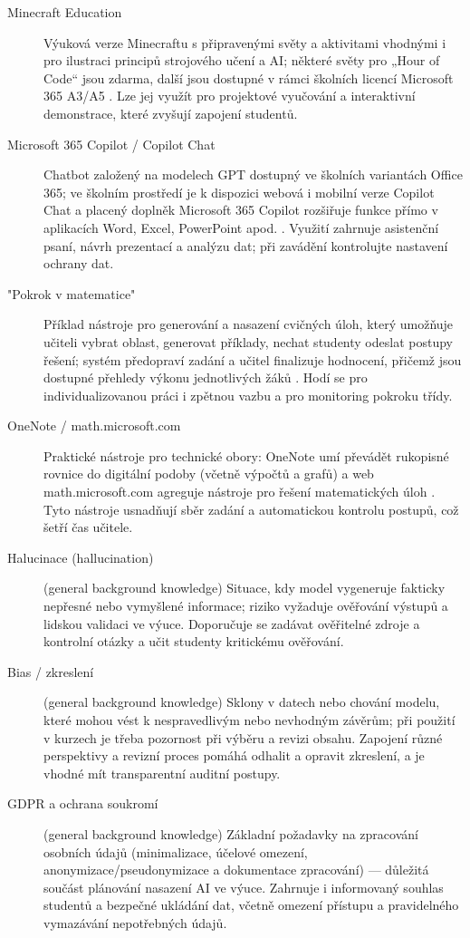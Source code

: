 \documentclass{report}%
\begin{document}
\begin{description}
  \item[Minecraft Education] Výuková verze Minecraftu s připravenými světy a aktivitami vhodnými i pro ilustraci principů strojového učení a AI; některé světy pro „Hour of Code“ jsou zdarma, další jsou dostupné v rámci školních licencí Microsoft 365 A3/A5 \cite{kb_ai_101_tipu_pdf_04e4a115_page_15_2}. Lze jej využít pro projektové vyučování a interaktivní demonstrace, které zvyšují zapojení studentů.
  \item[Microsoft 365 Copilot / Copilot Chat] Chatbot založený na modelech GPT dostupný ve školních variantách Office 365; ve školním prostředí je k dispozici webová i mobilní verze Copilot Chat a placený doplněk Microsoft 365 Copilot rozšiřuje funkce přímo v aplikacích Word, Excel, PowerPoint apod. \cite{kb_ai_101_tipu_pdf_04e4a115_page_3_1}. Využití zahrnuje asistenční psaní, návrh prezentací a analýzu dat; při zavádění kontrolujte nastavení ochrany dat.
  \item["Pokrok v matematice"] Příklad nástroje pro generování a nasazení cvičných úloh, který umožňuje učiteli vybrat oblast, generovat příklady, nechat studenty odeslat postupy řešení; systém předopraví zadání a učitel finalizuje hodnocení, přičemž jsou dostupné přehledy výkonu jednotlivých žáků \cite{kb_ai_101_tipu_pdf_04e4a115_page_8_1}. Hodí se pro individualizovanou práci i zpětnou vazbu a pro monitoring pokroku třídy.
  \item[OneNote / math.microsoft.com] Praktické nástroje pro technické obory: OneNote umí převádět rukopisné rovnice do digitální podoby (včetně výpočtů a grafů) a web math.microsoft.com agreguje nástroje pro řešení matematických úloh \cite{kb_ai_101_tipu_pdf_04e4a115_page_8_1}. Tyto nástroje usnadňují sběr zadání a automatickou kontrolu postupů, což šetří čas učitele.
  \item[Halucinace (hallucination)] (general background knowledge) Situace, kdy model vygeneruje fakticky nepřesné nebo vymyšlené informace; riziko vyžaduje ověřování výstupů a lidskou validaci ve výuce. Doporučuje se zadávat ověřitelné zdroje a kontrolní otázky a učit studenty kritickému ověřování.
  \item[Bias / zkreslení] (general background knowledge) Sklony v datech nebo chování modelu, které mohou vést k nespravedlivým nebo nevhodným závěrům; při použití v kurzech je třeba pozornost při výběru a revizi obsahu. Zapojení různé perspektivy a revizní proces pomáhá odhalit a opravit zkreslení, a je vhodné mít transparentní auditní postupy.
  \item[GDPR a ochrana soukromí] (general background knowledge) Základní požadavky na zpracování osobních údajů (minimalizace, účelové omezení, anonymizace/pseudonymizace a dokumentace zpracování) — důležitá součást plánování nasazení AI ve výuce. Zahrnuje i informovaný souhlas studentů a bezpečné ukládání dat, včetně omezení přístupu a pravidelného vymazávání nepotřebných údajů.
\end{description}
\end{document}

